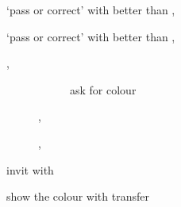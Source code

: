 \documentclass[../polish_club.tex]{subfiles}
\begin{document}

\begin{description}
    \item[] `pass or correct' with better \SpadeSym{} than \HeartSym, 
        \begin{description}
            \item[\PassBid] 
            \item[] 
        \end{description}
    \item[] `pass or correct' with better \HeartSym{} than \SpadeSym, 
        \begin{description}
            \item[\PassBid] 
            \item[] 
        \end{description}
    \item[] \Relay, 
        \begin{description}
            \item[] 
                \begin{description}
                    \item[] ask for colour
                        \begin{description}
                            \item[] 
                            \item[] 
                        \end{description}
                \end{description}
            \item[] , 
            \item[] , 
        \end{description}
    \item[]
    \item[] invit with 
    \item[] show the colour with transfer

\end{description}
\end{document}

